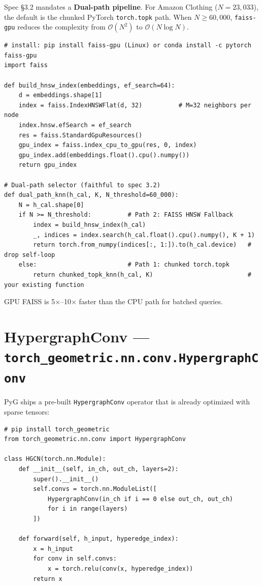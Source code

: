 \documentclass[11pt, a4paper]{article}
\begin{document}
Spec \S3.2 mandates a \textbf{Dual-path pipeline}. For Amazon Clothing ($N=23{,}033$), the default is the chunked PyTorch \texttt{torch.topk} path. When $N \geq 60{,}000$, \texttt{faiss-gpu} reduces the complexity from $\mathcal{O}(N^2)$ to $\mathcal{O}(N \log N)$.

\begin{lstlisting}
# install: pip install faiss-gpu (Linux) or conda install -c pytorch faiss-gpu
import faiss

def build_hnsw_index(embeddings, ef_search=64):
    d = embeddings.shape[1]
    index = faiss.IndexHNSWFlat(d, 32)          # M=32 neighbors per node
    index.hnsw.efSearch = ef_search
    res = faiss.StandardGpuResources()
    gpu_index = faiss.index_cpu_to_gpu(res, 0, index)
    gpu_index.add(embeddings.float().cpu().numpy())
    return gpu_index

# Dual-path selector (faithful to spec 3.2)
def dual_path_knn(h_cal, K, N_threshold=60_000):
    N = h_cal.shape[0]
    if N >= N_threshold:          # Path 2: FAISS HNSW Fallback
        index = build_hnsw_index(h_cal)
        _, indices = index.search(h_cal.float().cpu().numpy(), K + 1)
        return torch.from_numpy(indices[:, 1:]).to(h_cal.device)   # drop self-loop
    else:                         # Path 1: chunked torch.topk
        return chunked_topk_knn(h_cal, K)                          # your existing function
\end{lstlisting}

GPU FAISS is 5$\times$--10$\times$ faster than the CPU path for batched queries.

\section{HypergraphConv --- \texttt{torch\_geometric.nn.conv.HypergraphConv}}

PyG ships a pre-built \texttt{HypergraphConv} operator that is already optimized with sparse tensors:

\begin{lstlisting}
# pip install torch_geometric
from torch_geometric.nn.conv import HypergraphConv

class HGCN(torch.nn.Module):
    def __init__(self, in_ch, out_ch, layers=2):
        super().__init__()
        self.convs = torch.nn.ModuleList([
            HypergraphConv(in_ch if i == 0 else out_ch, out_ch)
            for i in range(layers)
        ])

    def forward(self, h_input, hyperedge_index):
        x = h_input
        for conv in self.convs:
            x = torch.relu(conv(x, hyperedge_index))
        return x
\end{lstlisting}
\end{document}
